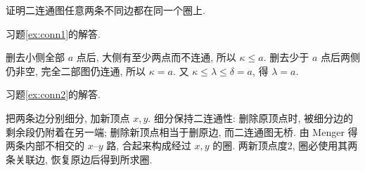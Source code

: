 \begin{exercise}\label{ex:conn2}
证明二连通图任意两条不同边都在同一个圈上.
\end{exercise}
习题\ref{ex:conn1}的解答.
\begin{solution}
删去小侧全部 $a$ 点后, 大侧有至少两点而不连通, 所以 $\kappa\le a$. 删去少于 $a$ 点后两侧仍非空, 完全二部图仍连通, 所以 $\kappa=a$. 又 $\kappa\le\lambda\le\delta=a$, 得 $\lambda=a$.
\end{solution}
习题\ref{ex:conn2}的解答.
\begin{solution}
把两条边分别细分, 加新顶点 $x,y$. 细分保持二连通性: 删除原顶点时, 被细分边的剩余段仍附着在另一端; 删除新顶点相当于删原边, 而二连通图无桥. 由 Menger 得两条内部不相交的 $x$--$y$ 路, 合起来构成经过 $x,y$ 的圈. 两新顶点度2, 圈必使用其两条关联边, 恢复原边后得到所求圈.
\end{solution}
